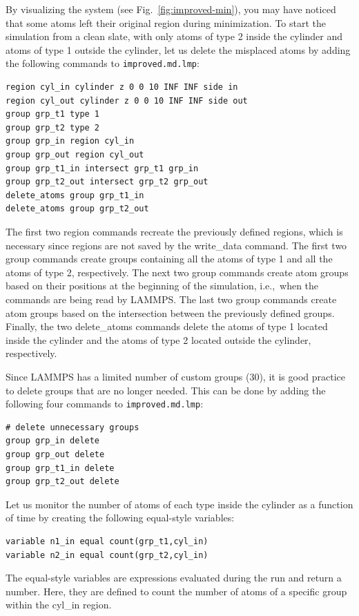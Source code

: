 \documentclass[9pt,tutorial]{livecoms}
\newcommand{\lmpcmd}[1]{\hspace{0pt}\colorbox{listing}{\textcolor{command}{\small{#1}}}\hspace{0pt}} %
\newcommand{\flecmd}[1]{\textcolor{command}{\texttt{#1}}} %
\begin{document}
By visualizing the system (see Fig.~\ref{fig:improved-min}), you may
have noticed that some atoms left their original region during
minimization.  To start the simulation from a clean slate, with only
atoms of type 2 inside the cylinder and atoms of type 1 outside the
cylinder, let us delete the misplaced atoms by adding the following
commands to \flecmd{improved.md.lmp}:
\begin{lstlisting}
region cyl_in cylinder z 0 0 10 INF INF side in
region cyl_out cylinder z 0 0 10 INF INF side out
group grp_t1 type 1
group grp_t2 type 2
group grp_in region cyl_in
group grp_out region cyl_out
group grp_t1_in intersect grp_t1 grp_in
group grp_t2_out intersect grp_t2 grp_out
delete_atoms group grp_t1_in
delete_atoms group grp_t2_out
\end{lstlisting}
The first two \lmpcmd{region} commands recreate the previously defined
regions, which is necessary since regions are not saved by the
\lmpcmd{write\_data} command.  The first two \lmpcmd{group} commands
create groups containing all the atoms of type 1 and all the
atoms of type 2, respectively.  The next two \lmpcmd{group} commands
create atom groups based on their positions at the beginning of the
simulation, i.e.,~when the commands are being read by LAMMPS.  The last
two \lmpcmd{group} commands create atom groups based on the intersection
between the previously defined groups.  Finally, the two
\lmpcmd{delete\_atoms} commands delete the atoms of type 1
located inside the cylinder and the atoms of type 2 located
outside the cylinder, respectively.

Since LAMMPS has a limited number of custom groups (30), it is good practice
to delete groups that are no longer needed.  This can be done by adding the
following four commands to \flecmd{improved.md.lmp}:
\begin{lstlisting}
# delete unnecessary groups
group grp_in delete
group grp_out delete
group grp_t1_in delete
group grp_t2_out delete
\end{lstlisting}

Let us monitor the number of atoms of each type inside the cylinder as a
function of time by creating the following equal-style variables:
\begin{lstlisting}
variable n1_in equal count(grp_t1,cyl_in)
variable n2_in equal count(grp_t2,cyl_in)
\end{lstlisting}
The equal-style \lmpcmd{variables} are expressions evaluated
during the run and return a number.  Here, they are defined to count
the number of atoms of a specific group within the \lmpcmd{cyl\_in} region.
\end{document}
